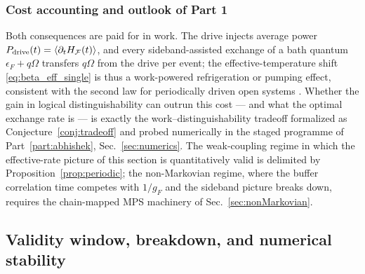 \documentclass[11pt,a4paper]{article}
\theoremstyle{definition}
\theoremstyle{remark}
\newcommand{\expect}[1]{\langle #1 \rangle}
\begin{document}
\subsubsection{Cost accounting and outlook of Part 1}
\label{sec:cost}
Both consequences are paid for in work. The drive injects average power
$P_{\rm drive}(t) = \expect{\partial_t H_\mathcal{F}(t)}$, and every
sideband-assisted exchange of a bath quantum $\epsilon_F+q\Omega$
transfers $q\Omega$ from the drive per event; the effective-temperature
shift \eqref{eq:beta_eff_single} is thus a work-powered refrigeration
or pumping effect, consistent with the second law for periodically
driven open systems \cite{Brandner2016}. Whether the gain in logical
distinguishability can outrun this cost --- and what the optimal
exchange rate is --- is exactly the work--distinguishability tradeoff
formalized as Conjecture~\ref{conj:tradeoff} and probed numerically in
the staged programme of Part~\ref{part:abhishek},
Sec.~\ref{sec:numerics}. The weak-coupling regime in which the
effective-rate picture of this section is quantitatively valid is
delimited by Proposition~\ref{prop:periodic}; the non-Markovian regime,
where the buffer correlation time competes with $1/g_F$ and the
sideband picture breaks down, requires the chain-mapped MPS machinery
of Sec.~\ref{sec:nonMarkovian}.
\subsection{Validity window, breakdown, and numerical stability}
\label{sec:validity}
 
\end{document}
